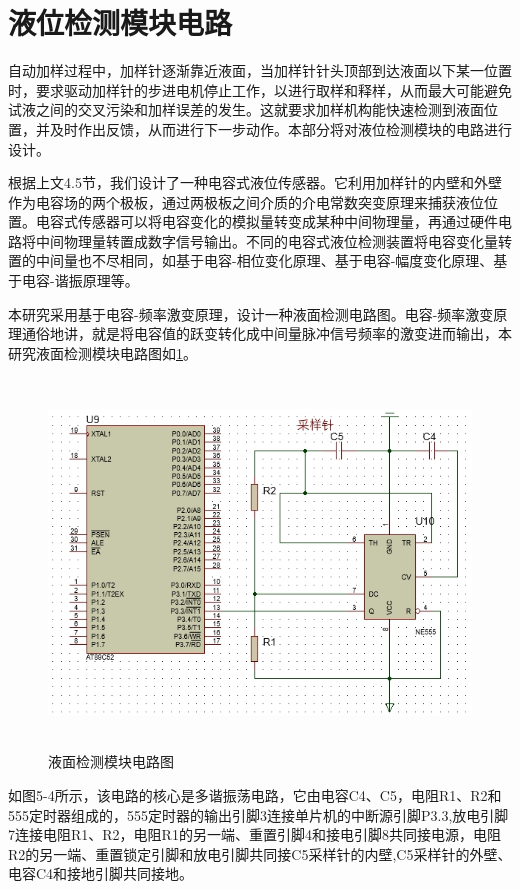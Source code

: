 \section{液位检测模块电路}
自动加样过程中，加样针逐渐靠近液面，当加样针针头顶部到达液面以下某一位置时，要求驱动加样针的步进电机停止工作，以进行取样和释样，从而最大可能避免试液之间的交叉污染和加样误差的发生。这就要求加样机构能快速检测到液面位置，并及时作出反馈，从而进行下一步动作。本部分将对液位检测模块的电路进行设计。

根据上文4.5节，我们设计了一种电容式液位传感器。它利用加样针的内壁和外壁作为电容场的两个极板，通过两极板之间介质的介电常数突变原理来捕获液位位置。电容式传感器可以将电容变化的模拟量转变成某种中间物理量，再通过硬件电路将中间物理量转置成数字信号输出。不同的电容式液位检测装置将电容变化量转置的中间量也不尽相同，如基于电容-相位变化原理\supercite{bib17}、基于电容-幅度变化原理、基于电容-谐振原理等\supercite{bib18}。

本研究采用基于电容-频率激变原理\supercite{bib16}，设计一种液面检测电路图。电容-频率激变原理通俗地讲，就是将电容值的跃变转化成中间量脉冲信号频率的激变进而输出，本研究液面检测模块电路图如\ref{fig:5-4}。

\begin{figure}[htbp!]
	\centering
	\includegraphics[height=9.8cm]{chap/figure/5-6.jpg}
	\caption{液面检测模块电路图}
	\label{fig:5-4}
\end{figure}

如图5-4所示，该电路的核心是多谐振荡电路，它由电容C4、C5，电阻R1、R2和555定时器组成的，555定时器的输出引脚3连接单片机的中断源引脚P3.3,放电引脚7连接电阻R1、R2，电阻R1的另一端、重置引脚4和接电引脚8共同接电源，电阻R2的另一端、重置锁定引脚和放电引脚共同接C5采样针的内壁,C5采样针的外壁、电容C4和接地引脚共同接地。

